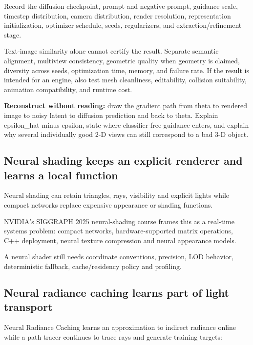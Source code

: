 Record the diffusion checkpoint, prompt and negative prompt, guidance scale, timestep distribution, camera distribution, render resolution, representation initialization, optimizer schedule, seeds, regularizers, and extraction/refinement stage.

Text-image similarity alone cannot certify the result. Separate semantic alignment, multiview consistency, geometric quality when geometry is claimed, diversity across seeds, optimization time, memory, and failure rate. If the result is intended for an engine, also test mesh cleanliness, editability, collision suitability, animation compatibility, and runtime cost.

\textbf{Reconstruct without reading:} draw the gradient path from theta to rendered image to noisy latent to diffusion prediction and back to theta. Explain epsilon\_hat minus epsilon, state where classifier-free guidance enters, and explain why several individually good 2-D views can still correspond to a bad 3-D object.

\subsection{Neural shading keeps an explicit renderer and learns a local function}\label{04-visual-computing-ii-ch035-neural-shading-keeps-an-explicit-renderer-and-learns-a-local-function}

Neural shading can retain triangles, rays, visibility and explicit lights while compact networks replace expensive appearance or shading functions.

NVIDIA's SIGGRAPH 2025 neural-shading course frames this as a real-time systems problem: compact networks, hardware-supported matrix operations, C++ deployment, neural texture compression and neural appearance models.

A neural shader still needs coordinate conventions, precision, LOD behavior, deterministic fallback, cache/residency policy and profiling.

\subsection{Neural radiance caching learns part of light transport}\label{04-visual-computing-ii-ch035-neural-radiance-caching-learns-part-of-light-transport}

Neural Radiance Caching learns an approximation to indirect radiance online while a path tracer continues to trace rays and generate training targets:

